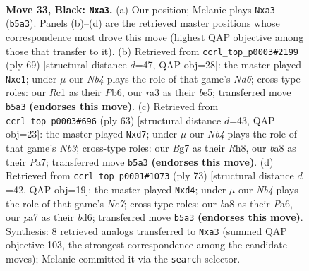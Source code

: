 \documentclass[11pt]{article}
\begin{document}
\clearpage

\begin{figure}[p]\centering
\begin{subfigure}{0.46\textwidth}\centering
\resizebox{\linewidth}{!}{%
\newchessgame
\chessboard[
  setfen={B7/P4kb1/1p4p1/1np5/6pP/R7/3NR2K/2r5 b - - 0 33},
  showmover=false,
  pgfstyle=straightmove, color=movearrow, markmove={b5-a3}
]}
\caption{}
\end{subfigure}\hfill
\begin{subfigure}{0.46\textwidth}\centering
\resizebox{\linewidth}{!}{%
\newchessgame
\chessboard[
  setfen={8/1B3k2/pp2p3/4Bp1P/3P4/r2n4/8/4RK2 b - - 2 35},
  showmover=false,
  pgfstyle=straightmove, color=movearrow, markmove={d3-e1}
]}
\caption{}
\end{subfigure}
\\[4pt]
\begin{subfigure}{0.46\textwidth}\centering
\resizebox{\linewidth}{!}{%
\newchessgame
\chessboard[
  setfen={7r/pp1R4/1n4pk/4p3/P3P3/7N/1P4P1/K1R5 b - - 0 32},
  showmover=false,
  pgfstyle=straightmove, color=movearrow, markmove={b6-d7}
]}
\caption{}
\end{subfigure}\hfill
\begin{subfigure}{0.46\textwidth}\centering
\resizebox{\linewidth}{!}{%
\newchessgame
\chessboard[
  setfen={8/5k2/p2B2p1/7p/3R4/7P/1r2nPP1/4R2K b - - 0 37},
  showmover=false,
  pgfstyle=straightmove, color=movearrow, markmove={e2-d4}
]}
\caption{}
\end{subfigure}
\caption{\textbf{Move 33, Black: \texttt{Nxa3}.} (a) Our position; Melanie plays \texttt{Nxa3} (\texttt{b5a3}). Panels (b)--(d) are the retrieved master positions whose correspondence most drove this move (highest QAP objective among those that transfer to it). (b) Retrieved from \texttt{ccrl\_top\_p0003\#2199} (ply 69) [structural distance $d$=47, QAP obj=28]: the master played \texttt{Nxe1}; under $\mu$ our \emph{Nb4} plays the role of that game's \emph{Nd6}; cross-type roles: our \emph{R}c1 as their \emph{P}b6, our \emph{r}a3 as their \emph{b}e5; transferred move \texttt{b5a3} \textbf{(endorses this move)}. (c) Retrieved from \texttt{ccrl\_top\_p0003\#696} (ply 63) [structural distance $d$=43, QAP obj=23]: the master played \texttt{Nxd7}; under $\mu$ our \emph{Nb4} plays the role of that game's \emph{Nb3}; cross-type roles: our \emph{B}g7 as their \emph{R}h8, our \emph{b}a8 as their \emph{P}a7; transferred move \texttt{b5a3} \textbf{(endorses this move)}. (d) Retrieved from \texttt{ccrl\_top\_p0001\#1073} (ply 73) [structural distance $d$=42, QAP obj=19]: the master played \texttt{Nxd4}; under $\mu$ our \emph{Nb4} plays the role of that game's \emph{Ne7}; cross-type roles: our \emph{b}a8 as their \emph{P}a6, our \emph{p}a7 as their \emph{b}d6; transferred move \texttt{b5a3} \textbf{(endorses this move)}. Synthesis: 8 retrieved analogs transferred to \texttt{Nxa3} (summed QAP objective 103, the strongest correspondence among the candidate moves); Melanie committed it via the \texttt{search} selector.}
\label{fig:thought-m65}
\end{figure}
\end{document}
